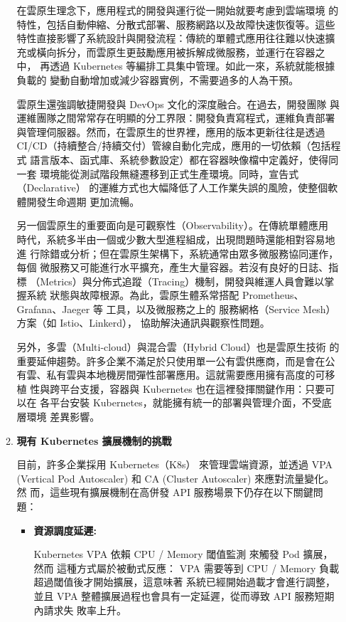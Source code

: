 \documentclass[12pt,a4paper]{article}
\begin{document}
\begin{enumerate}[label={(\zhdig*)}, leftmargin=2\parindent, listparindent=\parindent]
\begin{enumerate}[label={(\arabic*)}, leftmargin=\parindent, listparindent=\parindent]
在雲原生理念下，應用程式的開發與運行從一開始就要考慮到雲端環境
的特性，包括自動伸縮、分散式部署、服務網路以及故障快速恢復等。這些
特性直接影響了系統設計與開發流程：傳統的單體式應用往往難以快速擴
充或橫向拆分，而雲原生更鼓勵應用被拆解成微服務，並運行在容器之中，
再透過 Kubernetes 等編排工具集中管理。如此一來，系統就能根據負載的
變動自動增加或減少容器實例，不需要過多的人為干預。

雲原生還強調敏捷開發與 DevOps 文化的深度融合。在過去，開發團隊
與運維團隊之間常常存在明顯的分工界限：開發負責寫程式，運維負責部署
與管理伺服器。然而，在雲原生的世界裡，應用的版本更新往往是透過
CI/CD（持續整合/持續交付）管線自動化完成，應用的一切依賴（包括程式
語言版本、函式庫、系統參數設定）都在容器映像檔中定義好，使得同一套
環境能從測試階段無縫遷移到正式生產環境。同時，宣告式（Declarative）
的運維方式也大幅降低了人工作業失誤的風險，使整個軟體開發生命週期
更加流暢。

另一個雲原生的重要面向是可觀察性（Observability）。在傳統單體應用
時代，系統多半由一個或少數大型進程組成，出現問題時還能相對容易地進
行除錯或分析；但在雲原生架構下，系統通常由眾多微服務協同運作，每個
微服務又可能進行水平擴充，產生大量容器。若沒有良好的日誌、指標
（Metrics）與分佈式追蹤（Tracing）機制，開發與維運人員會難以掌握系統
狀態與故障根源。為此，雲原生體系常搭配 Prometheus、Grafana、Jaeger 等
工具，以及微服務之上的 服務網格（Service Mesh）方案（如 Istio、Linkerd），
協助解決通訊與觀察性問題。

另外，多雲（Multi-cloud）與混合雲（Hybrid Cloud）也是雲原生技術
的重要延伸趨勢。許多企業不滿足於只使用單一公有雲供應商，而是會在公
有雲、私有雲與本地機房間彈性部署應用。這就需要應用擁有高度的可移植
性與跨平台支援，容器與 Kubernetes 也在這裡發揮關鍵作用：只要可以在
各平台安裝 Kubernetes，就能擁有統一的部署與管理介面，不受底層環境
差異影響。

\item\textbf{現有 Kubernetes 擴展機制的挑戰\cite{7}}

目前，許多企業採用 Kubernetes（K8s） 來管理雲端資源，並透過 VPA
(Vertical Pod Autoscaler) 和 CA (Cluster Autoscaler) 來應對流量變化。然
而，這些現有擴展機制在高併發 API 服務場景下仍存在以下關鍵問題：
\begin{itemize}[leftmargin=\parindent, listparindent=\parindent]
    \item\textbf{資源調度延遲:}

Kubernetes VPA 依賴 CPU / Memory 閾值監測 來觸發 Pod 擴展，然而
這種方式屬於被動式反應：
VPA 需要等到 CPU / Memory 負載超過閾值後才開始擴展，這意味著
系統已經開始過載才會進行調整，並且 VPA 整體擴展過程也會具有一定延遲，從而導致 API 服務短期內請求失
敗率上升。


\end{itemize}
\end{enumerate}
\end{enumerate}
\end{document}
